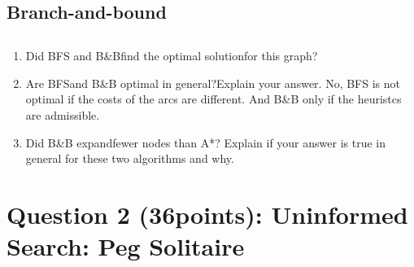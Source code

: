 \documentclass{article}
\newcommand{\centerfig}[2]{\begin{center}\texttt{[image: \#2]}\end{center}}
\begin{document}
\subsection{Branch-and-bound}

\subsection{}

\begin{enumerate}[label=(\alph*)]
    \item Did BFS and B\&Bfind the optimal solutionfor this graph?
    \item Are BFSand B\&B optimal in general?Explain your answer. 
    No, BFS is not optimal if the costs of the arcs are different. And B\&B only if 
    the heuristcs are admissible.
    \item Did B\&B expandfewer nodes than A*? Explain if your answer is true in general for these two algorithms and why.
\end{enumerate}


\clearpage
\section{Question 2 (36points): Uninformed Search: Peg Solitaire}
\end{document}

